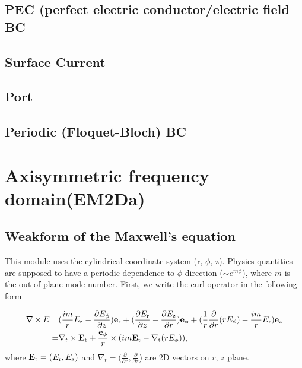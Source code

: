 \documentclass[11pt,a4paper,draft]{report}
\begin{document}
 \subsection{PEC (perfect electric conductor/electric field BC}
 
  \subsection{Surface Current}
  
 \subsection{Port}
 
 \subsection{Periodic (Floquet-Bloch) BC}
 
\section{Axisymmetric frequency domain(EM2Da)}
\subsection{Weakform of the Maxwell's equation}
This module uses the cylindrical coordinate system (r,  $\phi$, z). Physics quantities are supposed to have a periodic dependence to 
$\phi$ direction ($\sim e^{m \phi}$), where $m$ is the out-of-plane mode number. First, we write the curl operator in the following form

 \begin{align}
 \nabla \times E = &(\frac{im}{r} E_{\rm z} - \frac{\partial E_{\phi}}{\partial z})\mathbf{e}_{\rm r} +
( \frac{\partial E_{\rm r}}{\partial z} - \frac{\partial E_{\rm z}}{\partial r})\mathbf{e}_{\rm \phi}+
 (\frac{1}{r}\frac{\partial }{\partial r}(r E_{\phi}) - \frac{im}{r} E_{\rm r} )\mathbf{e}_{\rm z} 
 \notag \\ 
 = &\nabla_{t} \times \mathbf{E}_{\rm t} + \frac{\mathbf{e}_{\rm \phi}}{r} \times (im \mathbf{E}_{\rm t} - \nabla_{\rm t} (rE_{\rm \phi}) ),
 \end{align}
 where $\mathbf{E}_{\rm t} = (E_{\rm r}, E_{\rm z})$ and  $\nabla_{t} = (\frac{\partial }{\partial r}, \frac{\partial }{\partial z}$) are 2D vectors on $r$, $z$ plane.
 
\end{document}
